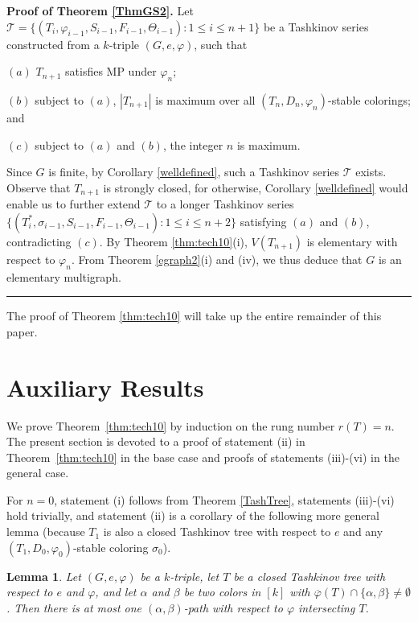 \documentclass[11pt]{article}
\newtheorem{lemma}[theorem]{Lemma}
\newcommand{\TT}{\mathcal {T}}
\newcommand{\phiv}{\varphi}
\def\qed{\hfill \rule{4pt}{7pt}}
\begin{document}
\vskip 3mm
{\bf Proof of Theorem \ref{ThmGS2}.} Let $\TT=\{(T_i, \phiv_{i-1}, S_{i-1}, F_{i-1}, \Theta_{i-1}): 1\le i \le n+1\}$ be a 
Tashkinov series constructed from a $k$-triple $(G,e, \varphi)$, such that 

$(a)$ $T_{n+1}$ satisfies MP under $\varphi_n$;

$(b)$ subject to $(a)$, $|T_{n+1}|$ is maximum over all $(T_n, D_n, \varphi_n)$-stable colorings; and  

$(c)$ subject to $(a)$ and $(b)$, the integer $n$ is maximum. 

\noindent 
Since $G$ is finite, by Corollary \ref{welldefined}, such a Tashkinov series $\TT$ exists. Observe that $T_{n+1}$ is strongly closed, 
for otherwise, Corollary \ref{welldefined} would enable us to further extend $\TT$ to a longer Tashkinov series $\{(T_i^*, \sigma_{i-1}, S_{i-1}, 
F_{i-1}, \Theta_{i-1}): 1\le i \le n+2\}$ satisfying $(a)$ and $(b)$, contradicting $(c)$.  By Theorem \ref{thm:tech10}(i), $V(T_{n+1})$ is elementary with 
respect to $\phiv_n$. From Theorem \ref{egraph2}(i) and (iv), we thus deduce that $G$ is an elementary multigraph. \qed 

\vskip 3mm

The proof of Theorem \ref{thm:tech10} will take up the entire remainder of this paper.

\section{Auxiliary Results}

We prove Theorem~\ref{thm:tech10} by induction on the rung number $r(T)=n$. The present section is devoted to a proof 
of statement (ii) in Theorem~\ref{thm:tech10} in the base case and proofs of statements (iii)-(vi) in the general case.  

For $n=0$, statement (i) follows from Theorem \ref{TashTree},  statements (iii)-(vi) hold trivially, and statement (ii) 
is a corollary of the following more general lemma (because $T_1$ is also a closed Tashkinov tree with respect to $e$ and 
any $(T_1, D_0, \phiv_{0})$-stable coloring $\sigma_0$).  

\begin{lemma}\label{tchange}
Let $(G,e, \varphi)$ be a $k$-triple, let $T$ be a closed Tashkinov tree with respect to $e$ and $\varphi$,
and let $\alpha$ and $\beta$ be two colors in $[k]$ with $\overline{\varphi}(T) \cap \{\alpha,\beta\}\ne 
\emptyset$. Then there is at most one $(\alpha,\beta)$-path with respect to $\varphi$ intersecting $T$. 
\end{lemma}
\end{document}
